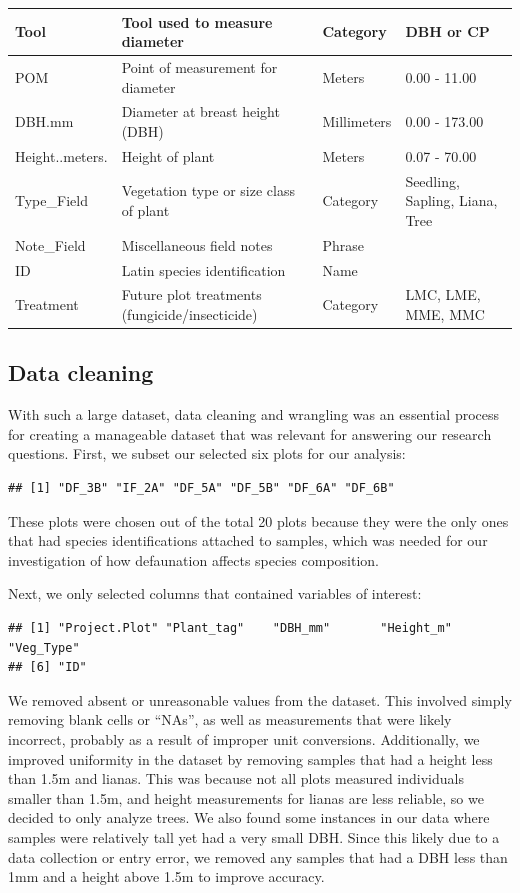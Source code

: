 \documentclass[
  12pt,
]{article}
\begin{document}
\begin{table}[H]
{\begin{tabular}[t]{l|l|l|l}
\hline
Tool & Tool used to measure diameter & Category & DBH or CP\\
\hline
POM & Point of measurement for diameter & Meters & 0.00 - 11.00\\
\hline
DBH.mm & Diameter at breast height (DBH) & Millimeters & 0.00 - 173.00\\
\hline
Height..meters. & Height of plant & Meters & 0.07 - 70.00\\
\hline
Type\_Field & Vegetation type or size class of plant & Category & Seedling, Sapling, Liana, Tree\\
\hline
Note\_Field & Miscellaneous field notes & Phrase & \\
\hline
ID & Latin species identification & Name & \\
\hline
Treatment & Future plot treatments (fungicide/insecticide) & Category & LMC, LME, MME, MMC\\
\hline
\end{tabular}}
\end{table}

\newpage

\hypertarget{data-cleaning}{%
\subsection{Data cleaning}\label{data-cleaning}}

With such a large dataset, data cleaning and wrangling was an essential
process for creating a manageable dataset that was relevant for
answering our research questions. First, we subset our selected six
plots for our analysis:

\begin{verbatim}
## [1] "DF_3B" "IF_2A" "DF_5A" "DF_5B" "DF_6A" "DF_6B"
\end{verbatim}

These plots were chosen out of the total 20 plots because they were the
only ones that had species identifications attached to samples, which
was needed for our investigation of how defaunation affects species
composition.

Next, we only selected columns that contained variables of interest:

\begin{verbatim}
## [1] "Project.Plot" "Plant_tag"    "DBH_mm"       "Height_m"     "Veg_Type"    
## [6] "ID"
\end{verbatim}

We removed absent or unreasonable values from the dataset. This involved
simply removing blank cells or ``NAs'', as well as measurements that
were likely incorrect, probably as a result of improper unit
conversions. Additionally, we improved uniformity in the dataset by
removing samples that had a height less than 1.5m and lianas. This was
because not all plots measured individuals smaller than 1.5m, and height
measurements for lianas are less reliable, so we decided to only analyze
trees. We also found some instances in our data where samples were
relatively tall yet had a very small DBH. Since this likely due to a
data collection or entry error, we removed any samples that had a DBH
less than 1mm and a height above 1.5m to improve accuracy.
\end{document}
